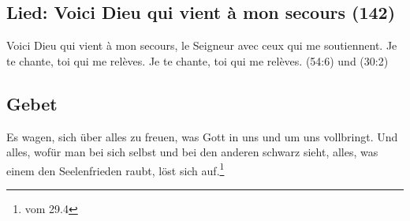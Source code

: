 \subsection{Lied: Voici Dieu qui vient à mon secours (142)}
\begin{lied}
Voici Dieu qui vient à mon secours, le Seigneur avec ceux qui me soutiennent. Je te chante, toi qui me relèves. Je te chante, toi qui me relèves. 
(54:6) und (30:2)
\end{lied}

\subsection{Gebet}
Es wagen, sich über alles zu freuen, was Gott in uns und um uns vollbringt. Und alles, wofür man bei sich selbst und bei den anderen schwarz sieht, alles, was einem den Seelenfrieden raubt, löst sich auf.\footnote{\cite{FR-heute} vom 29.4}